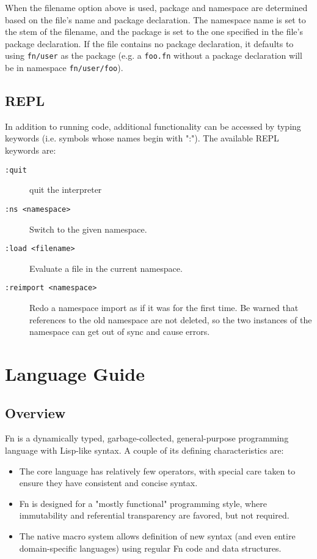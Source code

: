\documentclass[11pt]{article}
\begin{document}
When the filename option above is used, package and namespace are determined
based on the file's name and package declaration. The namespace name is set to
the stem of the filename, and the package is set to the one specified in the
file's package declaration. If the file contains no package declaration, it
defaults to using \texttt{fn/user} as the package (e.g. a \texttt{foo.fn} without a package
declaration will be in namespace \texttt{fn/user/foo}).


\subsection{REPL}
\label{sec:orgab6441a}

In addition to running code, additional functionality can be accessed by typing
keywords (i.e. symbols whose names begin with ":"). The available REPL keywords
are:

\begin{description}
\item[{\texttt{:quit}}] quit the interpreter
\item[{\texttt{:ns <namespace>}}] Switch to the given namespace.
\item[{\texttt{:load <filename>}}] Evaluate a file in the current namespace.
\item[{\texttt{:reimport <namespace>}}] Redo a namespace import as if it was for the first
time. Be warned that references to the old namespace are not deleted, so the
two instances of the namespace can get out of sync and cause errors.
\end{description}


\section{Language Guide}
\label{sec:orgd32069b}

\subsection{Overview}
\label{sec:org2d3f66e}

Fn is a dynamically typed, garbage-collected, general-purpose programming
language with Lisp-like syntax. A couple of its defining characteristics are:
\begin{itemize}
\item The core language has relatively few operators, with special care taken to
ensure they have consistent and concise syntax.
\item Fn is designed for a "mostly functional" programming style, where immutability
and referential transparency are favored, but not required.
\item The native macro system allows definition of new syntax (and even entire
domain-specific languages) using regular Fn code and data structures.
\end{itemize}
\end{document}
